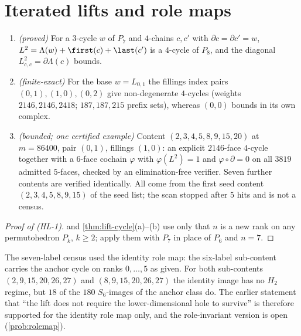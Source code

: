 \section{Iterated lifts and role maps}
\begin{theorem}\label{thm:iterated-lift}
\begin{enumerate}[label=(HL-\arabic*)]
\item \emph{(proved)} For a $3$-cycle $w$ of $P_7$ and $4$-chains $c,c'$ with $\partial c=\partial c'=w$, $L^2=\Lambda(w)+\first(c)+\last(c')$ is a $4$-cycle of $P_8$, and the diagonal $L^2_{c,c}=\partial\Lambda(c)$ bounds.
\item \emph{(finite-exact)} For the base $w=L_{0,1}$ the fillings index pairs $(0,1),(1,0),(0,2)$ give non-degenerate $4$-cycles (weights $2146,2146,2418$; $187,187,215$ prefix sets), whereas $(0,0)$ bounds in its own complex.
\item \emph{(bounded; one certified example)} Content $(2,3,4,5,8,9,15,20)$ at $m=86400$, pair $(0,1)$, fillings $(1,0)$: an explicit $2146$-face $4$-cycle together with a $6$-face cochain $\varphi$ with $\varphi(L^2)=1$ and $\varphi\circ\partial=0$ on all $3819$ admitted $5$-faces, checked by an elimination-free verifier. Seven further contents are verified identically. All come from the first seed content $(2,3,4,5,8,9,15)$ of the seed list; the scan stopped after $5$ hits and is not a census.
\end{enumerate}
\end{theorem}
\begin{proof}[Proof of (HL-1)]
 and \cref{thm:lift-cycle}(a)--(b) use only that $n$ is a new rank on any permutohedron $P_k$, $k\ge2$; apply them with $P_7$ in place of $P_6$ and $n=7$.
\end{proof}
\begin{observation}\label{obs:rolemap}
The seven-label census used the identity role map: the six-label sub-content carries the anchor cycle on ranks $0,\dots,5$ as given. For both sub-contents $(2,9,15,20,26,27)$ and $(8,9,15,20,26,27)$ the identity image has no $H_2$ regime, but $18$ of the $180$ $S_6$-images of the anchor class do. The earlier statement that ``the lift does not require the lower-dimensional hole to survive'' is therefore supported for the identity role map only, and the role-invariant version is open (\cref{prob:rolemap}).
\end{observation}

